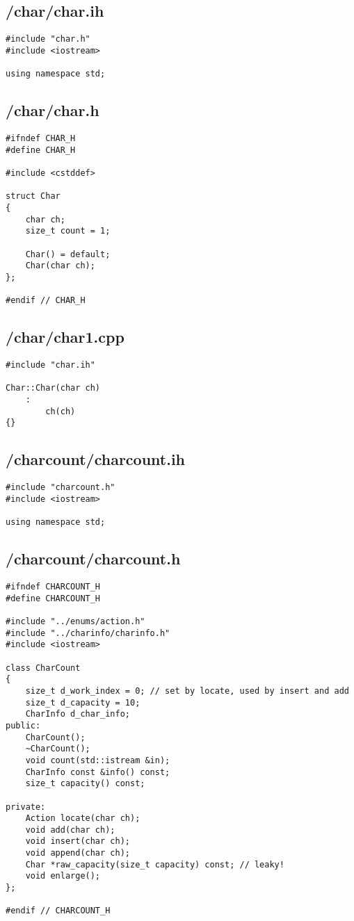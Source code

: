 \documentclass{article}
\begin{document}
\subsection*{/char/char.ih}
\begin{verbatim}
#include "char.h"
#include <iostream>

using namespace std;

\end{verbatim}
\subsection*{/char/char.h}
\begin{verbatim}
#ifndef CHAR_H
#define CHAR_H

#include <cstddef>

struct Char 
{
    char ch;
    size_t count = 1;

    Char() = default;
    Char(char ch);
};

#endif // CHAR_H

\end{verbatim}
\subsection*{/char/char1.cpp}
\begin{verbatim}
#include "char.ih"

Char::Char(char ch)
    :
        ch(ch)
{}
\end{verbatim}

\subsection*{/charcount/charcount.ih}
\begin{verbatim}
#include "charcount.h"
#include <iostream>

using namespace std;

\end{verbatim}
\subsection*{/charcount/charcount.h}
\begin{verbatim}
#ifndef CHARCOUNT_H
#define CHARCOUNT_H

#include "../enums/action.h"
#include "../charinfo/charinfo.h"
#include <iostream>

class CharCount 
{
    size_t d_work_index = 0; // set by locate, used by insert and add
    size_t d_capacity = 10;
    CharInfo d_char_info;
public:
    CharCount();
    ~CharCount();
    void count(std::istream &in);
    CharInfo const &info() const;
    size_t capacity() const;

private:
    Action locate(char ch);
    void add(char ch);
    void insert(char ch);
    void append(char ch);
    Char *raw_capacity(size_t capacity) const; // leaky!
    void enlarge();
};

#endif // CHARCOUNT_H

\end{verbatim}
\end{document}
